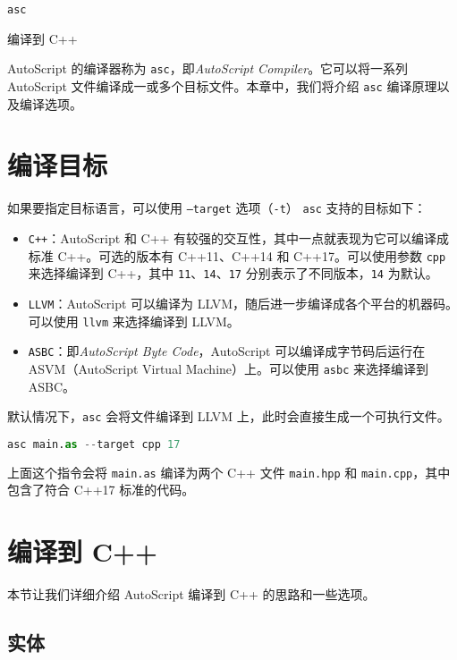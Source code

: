 \begin{introduction}
	\item \texttt{asc}
	\item 编译到 C++
\end{introduction}

AutoScript 的编译器称为 \texttt{asc}，即\emph{AutoScript Compiler}。它可以将一系列 AutoScript 文件编译成一或多个目标文件。本章中，我们将介绍 \texttt{asc} 编译原理以及编译选项。

\section{编译目标}

如果要指定目标语言，可以使用 \texttt{--target} 选项（\texttt{-t}） \texttt{asc} 支持的目标如下：

\begin{itemize}
	\item \texttt{C++}：AutoScript 和 C++ 有较强的交互性，其中一点就表现为它可以编译成标准 C++。可选的版本有 C++11、C++14 和 C++17。可以使用参数 \texttt{cpp} 来选择编译到 C++，其中 \texttt{11}、\texttt{14}、\texttt{17} 分别表示了不同版本，\texttt{14} 为默认。
	\item \texttt{LLVM}：AutoScript 可以编译为 LLVM，随后进一步编译成各个平台的机器码。可以使用 \texttt{llvm} 来选择编译到 LLVM。
	\item \texttt{ASBC}：即\emph{AutoScript Byte Code}，AutoScript 可以编译成字节码后运行在 ASVM（AutoScript Virtual Machine）上。可以使用 \texttt{asbc} 来选择编译到 ASBC。
\end{itemize}

默认情况下，\texttt{asc} 会将文件编译到 LLVM 上，此时会直接生成一个可执行文件。

\begin{lstlisting}[language=Python]
asc main.as --target cpp 17
\end{lstlisting}

上面这个指令会将 \texttt{main.as} 编译为两个 C++ 文件 \texttt{main.hpp} 和 \texttt{main.cpp}，其中包含了符合 C++17 标准的代码。


\section{编译到 C++}

本节让我们详细介绍 AutoScript 编译到 C++ 的思路和一些选项。

\subsection{实体}


